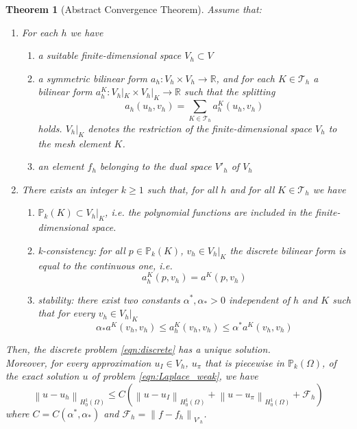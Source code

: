 \documentclass[10pt]{article}
\newcommand{\norm}[2]{\left\lVert#1\right\rVert_{#2}}
\newtheorem{theorem}{Theorem}
\begin{document}
\begin{theorem}[Abstract Convergence Theorem]
	Assume that:
	\begin{enumerate}
		\item For each $h$ we have
		\begin{enumerate}
			\item\label{ACT:1a} a suitable finite-dimensional space $V_h \subset V$
			\item\label{ACT:1b} a symmetric bilinear form $a_h:V_h \times V_h \rightarrow \mathbb{R}$, and for each $K \in \mathcal{T}_h$ a bilinear form
			$a_h^K:V_h|_K \times V_h|_K \rightarrow \mathbb{R}$ such that the splitting
			$$a_h(u_h,v_h)=\sum_{K \in \mathcal{T}_h} a_h^K(u_h,v_h)$$
			holds. $V_h|_K$ denotes the restriction of the finite-dimensional space $V_h$ to the mesh element $K$.
			\item\label{ACT:1c} an element $f_h$ belonging to the dual space $V'_h$ of $V_h$
		\end{enumerate}
	\item There exists an integer $k\geq 1$ such that, for all $h$ and for all $K \in \mathcal{T}_h$ we have
	\begin{enumerate}
		\item\label{ACT:2a} $\mathbb{P}_k(K) \subset V_h|_K$, i.e. the polynomial functions are included in the finite-dimensional space.
		\item\label{ACT:2b} \textit{k-consistency}: for all $p \in \mathbb{P}_k(K)$, $v_h \in V_h|_K$ the discrete bilinear form is equal to the continuous one, i.e. $$a_h^K(p,v_h)=a^K(p,v_h)$$
		\item\label{ACT:2c} \textit{stability}: there exist two constants $\alpha^{*}, \alpha_{*}>0$ independent of $h$ and $K$ such that for every $v_h \in V_h|_K$
		$$\alpha_{*}a^K(v_h,v_h) \leq a_h^K(v_h,v_h) \leq \alpha^{*}a^K(v_h,v_h)$$
	\end{enumerate}
	\end{enumerate}
	Then, the discrete problem \eqref{eqn:discrete} has a unique solution. \\
	Moreover, for every approximation $u_I \in V_h$, $u_\pi$ that is piecewise in $\mathbb{P}_k(\Omega)$, of the exact solution $u$ of problem \eqref{eqn:Laplace_weak}, we have
	$$\norm{u-u_h}{H_0^1(\Omega)} \leq C \left( 
	\norm{u-u_I}{H_0^1(\Omega)}+\norm{u-u_\pi}{H_0^1(\Omega)}+\mathcal{F}_h \right)
	$$
	where $C=C(\alpha^*,\alpha_*)$ and $\mathcal{F}_h=\norm{f-f_h}{V'_h}$.
	\label{thm:ACT}
\end{theorem}
\end{document}
